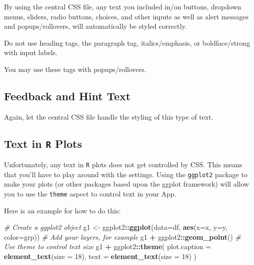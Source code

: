 \documentclass[]{book}
\newenvironment{Shaded}{\begin{snugshade}}{\end{snugshade}}
\newcommand{\CommentTok}[1]{\textcolor[rgb]{0.56,0.35,0.01}{\textit{#1}}}
\newcommand{\DataTypeTok}[1]{\textcolor[rgb]{0.13,0.29,0.53}{#1}}
\newcommand{\DecValTok}[1]{\textcolor[rgb]{0.00,0.00,0.81}{#1}}
\newcommand{\KeywordTok}[1]{\textcolor[rgb]{0.13,0.29,0.53}{\textbf{#1}}}
\newcommand{\NormalTok}[1]{#1}
\newcommand{\OperatorTok}[1]{\textcolor[rgb]{0.81,0.36,0.00}{\textbf{#1}}}
\newcommand{\StringTok}[1]{\textcolor[rgb]{0.31,0.60,0.02}{#1}}
\begin{document}
By using the central CSS file, any text you included in/on buttons, dropdown menus, sliders, radio buttons, choices, and other inputs as well as alert messages and popups/rollovers, will automatically be styled correctly.

Do not use heading tags, the paragraph tag, italics/emphasis, or boldface/strong with input labels.

You may use these tags with popups/rollovers.

\hypertarget{feedback-and-hint-text}{%
\subsection{Feedback and Hint Text}\label{feedback-and-hint-text}}

Again, let the central CSS file handle the styling of this type of text.

\hypertarget{text-in-r-plots}{%
\subsection{\texorpdfstring{Text in \texttt{R} Plots}{Text in R Plots}}\label{text-in-r-plots}}

Unfortunately, any text in \texttt{R} plots does not get controlled by CSS. This means that you'll have to play around with the settings. Using the \texttt{ggplot2} package to make your plots (or other packages based upon the ggplot framework) will allow you to use the \texttt{theme} aspect to control text in your App.

Here is an example for how to do this:

\begin{Shaded}
\begin{Highlighting}[]
\CommentTok{# Create a ggplot2 object}
\NormalTok{g1 <-}\StringTok{ }\NormalTok{ggplot2}\OperatorTok{::}\KeywordTok{ggplot}\NormalTok{(}\DataTypeTok{data=}\NormalTok{df, }\KeywordTok{aes}\NormalTok{(}\DataTypeTok{x=}\NormalTok{x, }\DataTypeTok{y=}\NormalTok{y, }\DataTypeTok{color=}\NormalTok{grp)) }
\CommentTok{# Add your layers, for example}
\NormalTok{g1 }\OperatorTok{+}\StringTok{ }\NormalTok{ggplot2}\OperatorTok{::}\KeywordTok{geom_point}\NormalTok{()}
\CommentTok{# Use theme to control text size}
\NormalTok{g1 }\OperatorTok{+}\StringTok{ }\NormalTok{ggplot2}\OperatorTok{::}\KeywordTok{theme}\NormalTok{(}
  \DataTypeTok{plot.caption =} \KeywordTok{element_text}\NormalTok{(}\DataTypeTok{size =} \DecValTok{18}\NormalTok{),}
  \DataTypeTok{text =} \KeywordTok{element_text}\NormalTok{(}\DataTypeTok{size =} \DecValTok{18}\NormalTok{)}
\NormalTok{  )}
\end{Highlighting}
\end{Shaded}
\end{document}
